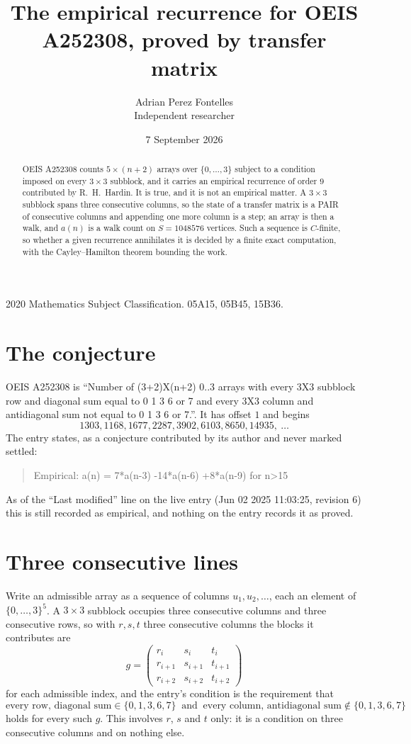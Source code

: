 \documentclass[11pt,a4paper]{article}
\title{The empirical recurrence for OEIS A252308, proved by transfer matrix}
\author{Adrian Perez Fontelles\\ \small Independent researcher}
\date{7 September 2026}
\theoremstyle{plain}
\theoremstyle{definition}
\begin{document}
\maketitle

\begin{abstract}
OEIS A252308 counts $5\times(n+2)$ arrays over $\{0,\dots,3\}$ subject to a condition imposed on
every $3\times3$ subblock, and it carries an empirical recurrence of order $9$
contributed by R.~H.~Hardin. It is true, and it is not an empirical matter. A $3\times3$
subblock spans three consecutive columns, so the state of a transfer matrix is a PAIR of
consecutive columns and appending one more column is a step; an array is then a walk, and
$a(n)$ is a walk count on $S=1048576$ vertices. Such a sequence is $C$-finite, so whether a given
recurrence annihilates it is decided by a finite exact computation, with the Cayley--Hamilton
theorem bounding the work.
\end{abstract}

\noindent\small 2020 Mathematics Subject Classification. 05A15, 05B45, 15B36.\normalsize

\section{The conjecture}

OEIS A252308 is ``Number of (3+2)X(n+2) 0..3 arrays with every 3X3 subblock row and diagonal sum equal to 0 1 3 6 or 7 and every 3X3 column and antidiagonal sum not equal to 0 1 3 6 or 7.''. It has offset $1$ and begins
\[
1303, 1168, 1677, 2287, 3902, 6103, 8650, 14935,\ \dots
\]
The entry states, as a conjecture contributed by its author and never marked settled:
\begin{quote}
Empirical: a(n) = 7*a(n-3) -14*a(n-6) +8*a(n-9) for n>15
\end{quote}
As of the ``Last modified'' line on the live entry (Jun 02 2025 11:03:25, revision 6) this is still
recorded as empirical, and nothing on the entry records it as proved.

\section{Three consecutive lines}

Write an admissible array as a sequence of columns $u_1,u_2,\dots$, each an element of
$\{0,\dots,3\}^{5}$. A $3\times3$ subblock occupies three consecutive columns and
three consecutive rows, so with $r,s,t$ three consecutive columns the blocks it
contributes are
\[
g=\begin{pmatrix}r_i&s_i&t_i\\ r_{i+1}&s_{i+1}&t_{i+1}\\ r_{i+2}&s_{i+2}&t_{i+2}\end{pmatrix}
\]
for each admissible index, and the entry's condition is the requirement that
\[
\text{every row, diagonal sum} \in \{0,1,3,6,7\}\ \text{ and }\ \text{every column, antidiagonal sum} \notin \{0,1,3,6,7\}
\]
holds for every such $g$. This involves $r$, $s$ and $t$ only: it is a condition on
three consecutive columns and on nothing else.
\end{document}
